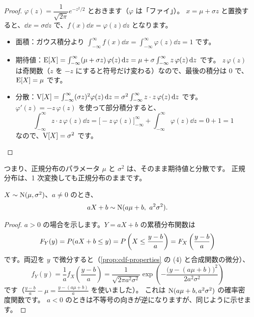 \begin{proof}
  $\varphi(z) = \dfrac{1}{\sqrt{2\pi}} e^{-z^2/2}$ とおきます（$\varphi$ は「ファイ」）。
  $x = \mu + \sigma z$ と置換すると、$\dd x = \sigma \dd z$ で、$f(x) \dd x = \varphi(z) \dd z$ となります。
  \begin{itemize}
    \item 面積：ガウス積分より $\int_{-\infty}^{\infty} f(x) \dd x = \int_{-\infty}^{\infty} \varphi(z) \dd z = 1$ です。
    \item 期待値：$\mathrm{E}[X] = \int_{-\infty}^{\infty} (\mu + \sigma z)\, \varphi(z) \mathop{}\!\mathrm{d} z = \mu + \sigma \int_{-\infty}^{\infty} z\, \varphi(z) \mathop{}\!\mathrm{d} z$ です。
      $z\,\varphi(z)$ は奇関数（$z$ を $-z$ にすると符号だけ変わる）なので、最後の積分は $0$ で、$\mathrm{E}[X] = \mu$ です。
    \item 分散：$\mathrm{V}[X] = \int_{-\infty}^{\infty} (\sigma z)^2 \varphi(z) \mathop{}\!\mathrm{d} z = \sigma^2 \int_{-\infty}^{\infty} z \cdot z\,\varphi(z) \mathop{}\!\mathrm{d} z$ です。
      $\varphi'(z) = -z\,\varphi(z)$ を使って部分積分すると、
      \[
        \int_{-\infty}^{\infty} z \cdot z\,\varphi(z) \dd z = \bigl[-z\,\varphi(z)\bigr]_{-\infty}^{\infty} + \int_{-\infty}^{\infty} \varphi(z) \dd z = 0 + 1 = 1
      \]
      なので、$\mathrm{V}[X] = \sigma^2$ です。\qedhere
  \end{itemize}
\end{proof}

つまり、正規分布のパラメータ $\mu$ と $\sigma^2$ は、そのまま期待値と分散です。
正規分布は、1 次変換しても正規分布のままです。

\begin{proposition}
  $X \sim \mathrm{N}(\mu, \sigma^2)$、$a \ne 0$ のとき、
  \[
    aX + b \sim \Normal(a\mu + b,\ a^2\sigma^2).
  \]
\end{proposition}

\begin{proof}
  $a > 0$ の場合を示します。$Y = aX + b$ の累積分布関数は
  \[
    F_Y(y) = P(aX + b \le y) = P\left(X \le \frac{y - b}{a}\right) = F_X\left(\frac{y - b}{a}\right)
  \]
  です。両辺を $y$ で微分すると（\cref{prop:cdf-properties} の (4) と合成関数の微分）、
  \[
    f_Y(y) = \frac{1}{a} f_X\left(\frac{y - b}{a}\right)
    = \frac{1}{\sqrt{2\pi a^2\sigma^2}} \exp\left(-\frac{\bigl(y - (a\mu + b)\bigr)^2}{2a^2\sigma^2}\right)
  \]
  です（$\frac{y-b}{a} - \mu = \frac{y - (a\mu + b)}{a}$ を使いました）。
  これは $\mathrm{N}(a\mu + b, a^2\sigma^2)$ の確率密度関数です。
  $a < 0$ のときは不等号の向きが逆になりますが、同じように示せます。
\end{proof}

